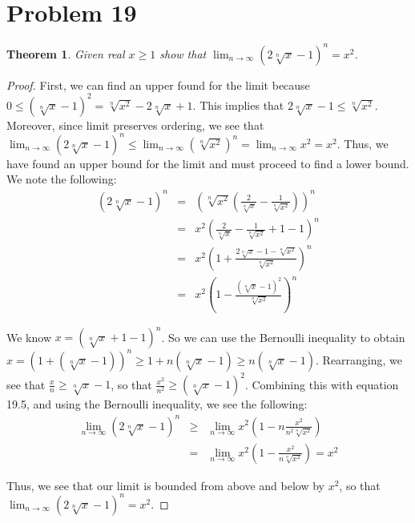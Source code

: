 \documentclass[psamsfonts]{amsart}
\newtheorem{thm}{Theorem}[section]
\theoremstyle{definition}
\theoremstyle{remark}
\numberwithin{equation}{section}
\begin{document}
\section{Problem 19}

\begin{thm}
Given real $x \geq 1$ show that $\lim_{n \to \infty} (2 \sqrt[n]{x} - 1)^n = x^2$. 
\end{thm}

\begin{proof}
First, we can find an upper found for the limit because $0 \leq ( \sqrt[n]{x} - 1)^2 = \sqrt[n]{x^2} - 2 \sqrt[n]{x} + 1$. This implies that $2 \sqrt[n]{x} - 1 \leq \sqrt[n]{x^2}$. Moreover, since limit preserves ordering, we see that $\lim_{n \to \infty} (2 \sqrt[n]{x} -1)^n \leq \lim_{n \to \infty} (\sqrt[n]{x^2})^n = \lim_{n \to \infty} x^2 = x^2$. Thus, we have found an upper bound for the limit and must proceed to find a lower bound. We note the following:
\begin{eqnarray}
\left( 2 \sqrt[n]{x} - 1 \right)^n &=& \left( \sqrt[n]{x^2} \left( \frac{2}{\sqrt[n]{x}} - \frac{1}{\sqrt[n]{x^2}} \right) \right)^n \\
&=& x^2 \left(  \frac{2}{\sqrt[n]{x}} - \frac{1}{\sqrt[n]{x^2}} + 1 - 1 \right)^n \\
&=& x^2 \left( 1 + \frac{2 \sqrt[n]{x} - 1 - \sqrt[n]{x^2}}{\sqrt[n]{x^2}} \right)^n \\
&=& x^2 \left( 1 - \frac{(\sqrt[n]{x} - 1)^2}{\sqrt[n]{x^2}} \right)^n
\end{eqnarray}

We know $x = (\sqrt[n]{x} + 1 - 1)^n$. So we can use the Bernoulli inequality to obtain $x = (1 + (\sqrt[n]{x} -1))^n \geq 1 + n ( \sqrt[n]{x} - 1 ) \geq n (\sqrt[n]{x} - 1)$. Rearranging, we see that $\frac{x}{n} \geq \sqrt[n]{x} - 1$, so that $\frac{x^2}{n^2} \geq (\sqrt[n]{x} - 1)^2$. Combining this with equation 19.5, and using the Bernoulli inequality, we see the following:
\begin{eqnarray}
\lim_{n \to \infty} (2 \sqrt[n]{x} - 1)^n &\geq& \lim_{n \to \infty} x^2 \left( 1 - n \frac{x^2}{n^2 \sqrt[n]{x^2}} \right) \\
&=& \lim_{n \to \infty} x^2 \left(1 - \frac{x^2}{n \sqrt[n]{x^2}} \right) = x^2
\end{eqnarray} 

Thus, we see that our limit is bounded from above and below by $x^2$, so that $\lim_{n \to \infty} (2 \sqrt[n]{x} - 1)^n = x^2$. 
\end{proof}
\end{document}
